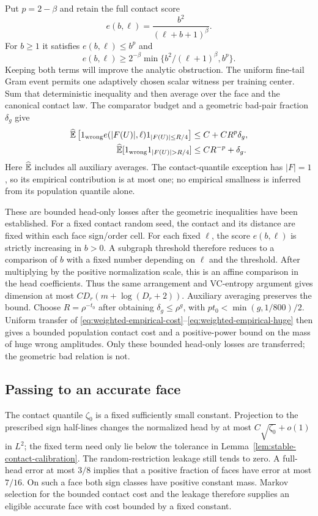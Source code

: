 Put $p=2-\beta$ and retain the full contact score
\[
 e(b,\ell)=\frac{b^2}{(\ell+b+1)^\beta}.
\]
For $b\ge1$ it satisfies $e(b,\ell)\le b^p$ and
\begin{equation}\label{eq:full-contact-minimum}
 e(b,\ell)\ge 2^{-\beta}
       \min\{b^2/(\ell+1)^\beta,b^p\}.
\end{equation}
Keeping both terms will improve the analytic obstruction.
The uniform fine-tail Gram event permits one adaptively chosen scalar
witness per training center. Sum that deterministic inequality and
then average over the face and the canonical contact law. The
comparator budget and a geometric bad-pair fraction $\delta_g$ give
\begin{align}
 \widehat\E\left[
   1_{\rm wrong}e(|F(U)|,\ell)
                      1_{|F(U)|\le R/4}\right]
    &\le C+CR^p\delta_g,\label{eq:weighted-empirical-cost}\\
 \widehat\E[1_{\rm wrong}1_{|F(U)|>R/4}]
    &\le CR^{-p}+\delta_g.\label{eq:weighted-empirical-huge}
\end{align}
Here $\widehat{\mathbb E}$ includes all auxiliary averages. The contact-quantile
exception has $|F|=1$, so its empirical contribution is at most one;
no empirical smallness is inferred from its population quantile alone.

These are bounded head-only losses after the geometric inequalities
have been established. For a fixed contact random seed, the contact
and its distance are fixed within each face sign/order cell.
For each fixed $\ell$, the score $e(b,\ell)$ is strictly increasing
in $b>0$. A subgraph threshold therefore reduces to a comparison of
$b$ with a fixed number depending on $\ell$ and the threshold. After
multiplying by the positive normalization scale, this is an affine
comparison in the head coefficients. Thus the same
arrangement and VC-entropy argument gives dimension at most
$CD_r(m+\log(D_r+2))$. Auxiliary averaging preserves the bound.
Choose $R=\rho^{-t_0}$ after obtaining $\delta_g\le\rho^g$, with
$pt_0<\min(g,1/800)/2$. Uniform transfer of
\eqref{eq:weighted-empirical-cost}--\eqref{eq:weighted-empirical-huge}
then gives a bounded population contact cost and a positive-power
bound on the mass of huge wrong amplitudes. Only these bounded
head-only losses are transferred; the geometric bad relation is not.

\subsection{Passing to an accurate face}
The contact quantile $\zeta_0$ is a fixed sufficiently small constant.
Projection to the prescribed sign half-lines changes the normalized
head by at most $C\sqrt{\zeta_0}+o(1)$ in $L^2$; the fixed term need
only lie below the tolerance in
Lemma~\ref{lem:stable-contact-calibration}. The random-restriction
leakage still tends to zero. A full-head error at most $3/8$ implies
that a positive fraction of faces have error at most $7/16$. On such
a face both sign classes have positive constant mass. Markov selection
for the bounded contact cost and the leakage therefore supplies an
eligible accurate face with cost bounded by a fixed constant.

